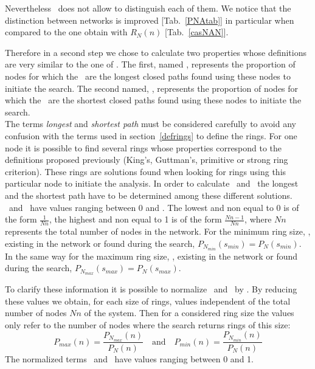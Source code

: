 Nevertheless \pnr\ does not allow to distinguish each of them. 
We notice that the distinction between networks is improved [Tab.~\ref{PNAtab}] in particular when compared to the one obtain with $R_N(n)$ [Tab.~\ref{casNAN}]. 
\newpage
\par
Therefore in a second step we chose to calculate two properties whose definitions are very similar to the one of \pnr. 
The first, named \pnrmax, represents the proportion of nodes for which the \nn\ are the longest closed paths found using these nodes to initiate the search. 
The second named, \pnrmin, represents the proportion of nodes for which the \nn\ are the shortest closed paths found using these nodes to initiate the search. \\
The terms {\em{longest}} and {\em{shortest path}} must be considered carefully to avoid any confusion with the terms used in section~\ref{defrings} to define the rings. 
For one node it is possible to find several rings whose properties correspond to the definitions proposed previously (King's, Guttman's, primitive or strong ring criterion). 
These rings are solutions found when looking for rings using this particular node to initiate the analysis. 
In order to calculate \pnrmax\ and \pnrmin\ the longest and the shortest path have to be determined among these different solutions. \\
\pnrmax\ and \pnrmin\ have values ranging between 0 and \pnr. 
The lowest and non equal to 0 is of the form $\frac{1}{Nn}$, the highest and non equal to 1 is of the form $\frac{Nn-1}{Nn}$, where $Nn$ represents the total number of nodes in the network. 
For the minimum ring size, \smin, existing in the network or found during the search, $P_{N_{min}}(s_{min})=P_N(s_{min})$. 
In the same way for the maximum ring size, \smax, existing in the network or found during the search, $P_{N_{max}}(s_{max})=P_N(s_{max})$. \\
\par 
To clarify these information it is possible to normalize \pnrmax\ and \pnrmin\ by \pnr. 
By reducing these values we obtain, for each size of rings, values independent of the total number of nodes $Nn$ of the system. 
Then for a considered ring size the values only refer to the number of nodes where the search returns rings of this size:
\begin{equation}
P_{max}(n) = \frac{P_{N_{max}}(n)}{P_N(n)} \quad \text{and} \quad P_{min}(n) = \frac{P_{N_{min}}(n)}{P_N(n)} \nonumber 
\end{equation}
The normalized terms \pmax\ and \pmin\ have values ranging between 0 and 1. 
